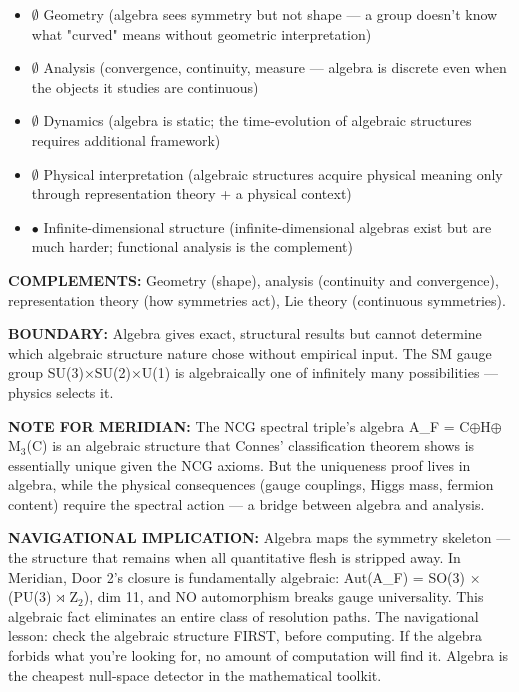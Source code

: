 \begin{itemize}[nosep,leftmargin=*]
  \item $\emptyset$ Geometry (algebra sees symmetry but not shape — a group doesn't know what "curved" means without geometric interpretation)
  \item $\emptyset$ Analysis (convergence, continuity, measure — algebra is discrete even when the objects it studies are continuous)
  \item $\emptyset$ Dynamics (algebra is static; the time-evolution of algebraic structures requires additional framework)
  \item $\emptyset$ Physical interpretation (algebraic structures acquire physical meaning only through representation theory + a physical context)
  \item $\bullet$ Infinite-dimensional structure (infinite-dimensional algebras exist but are much harder; functional analysis is the complement)
\end{itemize}


\textbf{COMPLEMENTS:} Geometry (shape), analysis (continuity and convergence), representation theory (how symmetries act), Lie theory (continuous symmetries).


\textbf{BOUNDARY:} Algebra gives exact, structural results but cannot determine which algebraic structure nature chose without empirical input. The SM gauge group SU(3)×SU(2)×U(1) is algebraically one of infinitely many possibilities — physics selects it.


\textbf{NOTE FOR MERIDIAN:} The NCG spectral triple's algebra A\_F = C$\oplus$H$\oplus$M$_3$(C) is an algebraic structure that Connes' classification theorem shows is essentially unique given the NCG axioms. But the uniqueness proof lives in algebra, while the physical consequences (gauge couplings, Higgs mass, fermion content) require the spectral action — a bridge between algebra and analysis.


\textbf{NAVIGATIONAL IMPLICATION:} Algebra maps the symmetry skeleton — the structure that remains when all quantitative flesh is stripped away. In Meridian, Door 2's closure is fundamentally algebraic: Aut(A\_F) = SO(3) × (PU(3) $\rtimes$ Z$_2$), dim 11, and NO automorphism breaks gauge universality. This algebraic fact eliminates an entire class of resolution paths. The navigational lesson: check the algebraic structure FIRST, before computing. If the algebra forbids what you're looking for, no amount of computation will find it. Algebra is the cheapest null-space detector in the mathematical toolkit.


